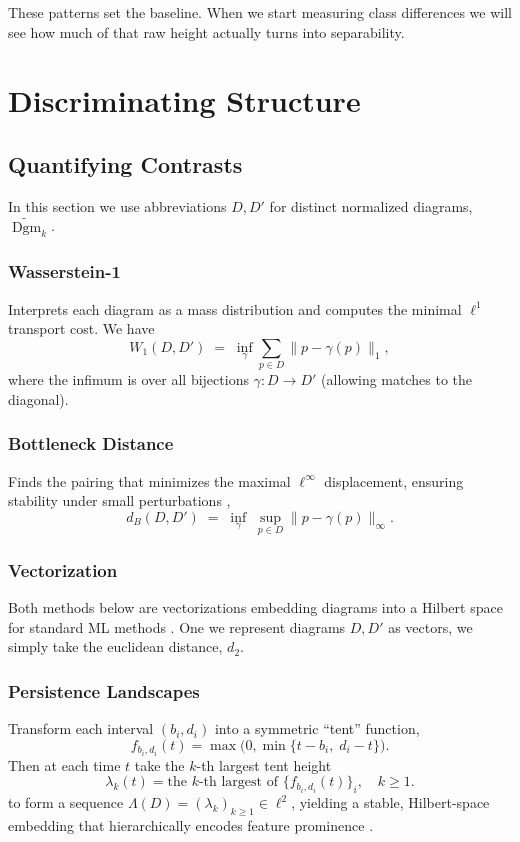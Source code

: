\documentclass[fleqn,10pt]{SelfArx}
\begin{document}
These patterns set the baseline.  When we start measuring class differences we will see how much of that raw height actually turns into separability.

\FloatBarrier  %
\clearpage      %

\section{Discriminating Structure}


\subsection{Quantifying Contrasts}
In this section we use abbreviations $D,D'$ for distinct normalized diagrams, $\widetilde{\operatorname{Dgm}}_k$.
\subsubsection{Wasserstein-1}

Interprets each diagram as a mass distribution and computes the minimal $\ell^1$ transport cost. We have
$$
W_1(D,D') \;=\; \inf_{\gamma} \sum_{p \in D} \bigl\lVert p - \gamma(p)\bigr\rVert_{1},
$$
where the infimum is over all bijections $\gamma\colon D\to D'$ (allowing matches to the diagonal).

\subsubsection{Bottleneck Distance}

Finds the pairing that minimizes the maximal $\ell^\infty$ displacement, ensuring stability under small perturbations \cite{cohen2007stability},
$$
d_B(D,D') \;=\; \inf_{\gamma}\;\sup_{p \in D} \bigl\lVert p - \gamma(p)\bigr\rVert_{\infty}.
$$

\subsubsection*{Vectorization}
Both methods below are vectorizations embedding diagrams into a Hilbert space for standard ML methods \cite{bubenik2015statistical,adams2017persistence}. One we represent diagrams $D,D'$ as vectors, we simply take the euclidean distance, $d_2$.

\subsubsection{Persistence Landscapes}
Transform each interval $(b_i,d_i)$ into a symmetric “tent” function, 
$$
f_{b_i,d_i}(t)=\max\bigl(0,\min\{t-b_i,\;d_i-t\}\bigr).
$$
Then at each time $t$ take the $k$-th largest tent height
$$
\lambda_k(t)=\text{the $k$-th largest of }\{f_{b_i,d_i}(t)\}_i,\quad k\ge1.
$$
to form a sequence $\Lambda(D)=(\lambda_k)_{k\ge1}\in\ell^2$, yielding a stable, Hilbert-space embedding that hierarchically encodes feature prominence \cite{bubenik2015statistical}. \\
\end{document}

